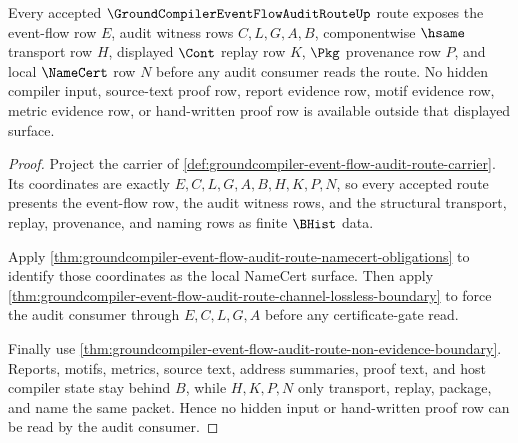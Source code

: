 \begin{theorem}
\label{thm:groundcompiler-event-flow-audit-obligation-surface}
Every accepted $\GroundCompilerEventFlowAuditRouteUp$ route exposes the event-flow row $E$, audit witness rows $C,L,G,A,B$, componentwise $\hsame$ transport row $H$, displayed $\Cont$ replay row $K$, $\Pkg$ provenance row $P$, and local $\NameCert$ row $N$ before any audit consumer reads the route. No hidden compiler input, source-text proof row, report evidence row, motif evidence row, metric evidence row, or hand-written proof row is available outside that displayed surface.
\end{theorem}
\begin{proof}
Project the carrier of \autoref{def:groundcompiler-event-flow-audit-route-carrier}. Its coordinates are exactly $E,C,L,G,A,B,H,K,P,N$, so every accepted route presents the event-flow row, the audit witness rows, and the structural transport, replay, provenance, and naming rows as finite $\BHist$ data.

Apply \autoref{thm:groundcompiler-event-flow-audit-route-namecert-obligations} to identify those coordinates as the local NameCert surface. Then apply \autoref{thm:groundcompiler-event-flow-audit-route-channel-lossless-boundary} to force the audit consumer through $E,C,L,G,A$ before any certificate-gate read.

Finally use \autoref{thm:groundcompiler-event-flow-audit-route-non-evidence-boundary}. Reports, motifs, metrics, source text, address summaries, proof text, and host compiler state stay behind $B$, while $H,K,P,N$ only transport, replay, package, and name the same packet. Hence no hidden input or hand-written proof row can be read by the audit consumer.
\end{proof}

